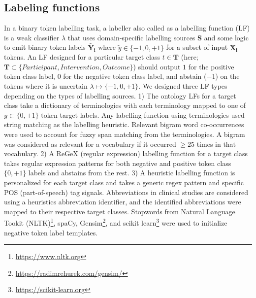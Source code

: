 \documentclass[10.7pt,]{article}
\begin{document}
\subsection{Labeling functions}\label{lfs}
%
In a binary token labelling task, a labeller also called as a labelling function (LF) is a weak classifier $\lambda$ that uses domain-specific labelling sources $\bm{S}$ and some logic to emit binary token labels $ \widetilde{\bm{Y_{i}}}$ where $ \widetilde{y} \in \{-1, 0, +1\}$ for a subset of input $\bm{X_{i}}$ tokens.
An LF designed for a particular target class $t \in \bm{T}$ (here; $\bm{T} \subset \{ Participant, Intervention, Outcome \} $) should output  $1$ for the positive token class label, $0$ for the negative token class label, and abstain ($-1$) on the tokens where it is uncertain $\lambda \mapsto \{-1, 0, +1\}$.
We designed three LF types depending on the types of labelling sources.
1) The ontology LFs for a target class take a dictionary of terminologies with each terminology mapped to one of $y \subset \{0, +1\} $ token target labels.
Any labelling function using terminologies used string matching as the labelling heuristic.
Relevant bigram word co-occurrences were used to account for fuzzy span matching from the terminologies.
A bigram was considered as relevant for a vocabulary if it occurred $\geq25$ times in that vocabulary.
2) A ReGeX (regular expression) labelling function for a target class takes regular expression patterns for both negative and positive token class $\{0, +1\}$ labels and abstains from the rest.
3) A heuristic labelling function is personalized for each target class and takes a generic regex pattern and specific POS (part-of-speech) tag signals.
Abbreviations in clinical studies are considered using a heuristics abbreviation identifier, and the identified abbreviations were mapped to their respective target classes.
Stopwords from Natural Language Tookit (NLTK)\footnote{\url{https://www.nltk.org}}, spaCy, Gensim\footnote{\url{https://radimrehurek.com/gensim/}}, and scikit learn\footnote{\url{https://scikit-learn.org}} were used to initialize negative token label templates.
%
\end{document}
